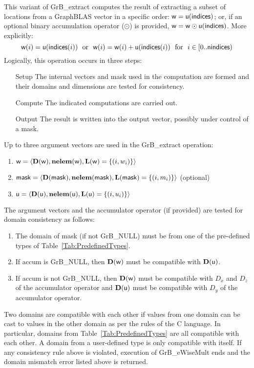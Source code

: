 This variant of {\sf GrB\_extract} computes the result of extracting a subset of
locations from a GraphBLAS vector in a specific order: 
${\sf w} = {\sf u}({\sf indices})$; or, if an optional binary accumulation 
operator ($\odot$) is provided, ${\sf w} = {\sf w} \odot {\sf u}({\sf indices})$.  
More explicitly:
\[
    {\sf w}(i) = {\sf u}({\sf indices}(i)) \mbox{~~or~~} 
    {\sf w}(i) = {\sf w}(i) + {\sf u}({\sf indices}(i))
    \mbox{~~for~~} i \in \left[0..{\sf nindices}\right)
\]  
Logically, this operation occurs in three steps:
\begin{enumerate}[leftmargin=0.75in]
\item[Setup] The internal vectors and mask used in the computation are formed 
and their domains and dimensions are tested for consistency.
\item[Compute] The indicated computations are carried out.
\item[Output] The result is written into the output vector, possibly under 
control of a mask.
\end{enumerate}

Up to three argument vectors are used in the {\sf GrB\_extract} operation:
\begin{enumerate}
	\item ${\sf w} = \langle \bold{D}({\sf w}),\bold{nelem}({\sf w}),\bold{L}({\sf w}) = \{(i,w_i) \} \rangle$
	\item ${\sf mask} = \langle \bold{D}({\sf mask}),\bold{nelem}({\sf mask}),\bold{L}({\sf mask}) = \{(i,m_i) \} \rangle$ (optional)
	\item ${\sf u} = \langle \bold{D}({\sf u}),\bold{nelem}({\sf u}),\bold{L}({\sf u}) = \{(i,u_i) \} \rangle$
\end{enumerate}

The argument vectors and the accumulator 
operator (if provided) are tested for domain consistency as follows:
\begin{enumerate}
	\item The domain of {\sf mask} (if not {\sf GrB\_NULL}) must be from one of the pre-defined types of Table~\ref{Tab:PredefinedTypes}.

	\item If {\sf accum} is {\sf GrB\_NULL}, then $\bold{D}({\sf w})$ must be 
    compatible with $\bold{D}({\sf u})$.

	\item If {\sf accum} is not {\sf GrB\_NULL}, then $\bold{D}({\sf w})$ must be
    compatible with $D_x$ and $D_z$ of the accumulator operator and 
    $\bold{D}({\sf u})$ must be compatible with $D_y$ of the accumulator operator.
\end{enumerate}
Two domains are compatible with each other if values from one domain can be cast 
to values in the other domain as per the rules of the C language.
In particular, domains from Table~\ref{Tab:PredefinedTypes} are all compatible 
with each other. A domain from a user-defined type is only compatible with itself.
If any consistency rule above is violated, execution of {\sf GrB\_eWiseMult} ends
and the domain mismatch error listed above is returned.

